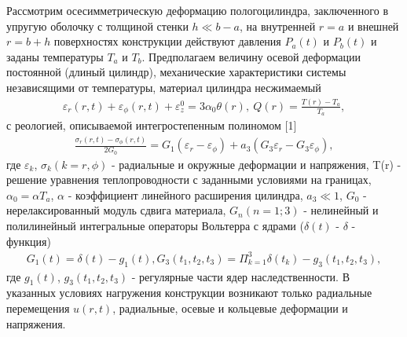 \vzmscaption

Рассмотрим осесимметрическую деформацию полого цилиндра, заключенного в упругую оболочку с толщиной стенки $h \ll b-a$,
на внутренней $r=a$ и внешней $r=b+h$ поверхностях конструкции действуют давления $P_a(t)$ и $P_b(t)$ и заданы температуры $T_a$ и $T_b$.
Предполагаем величину осевой деформации постоянной (длиный цилиндр), механические характеристики системы независящими от температуры, материал цилиндра несжимаемый
\begin{equation}\label{eq:1}
    \begin{gathered}
        \varepsilon_r(r,t)+\varepsilon_\phi(r,t)+\varepsilon^0_z=3\alpha_0 \theta(r), \ Q(r)=\frac{T(r)-T_a}{T_a},
    \end{gathered}
\end{equation}
\noindent с реологией, описываемой интегростепенным полиномом [1]
\begin{equation}\label{eq:2}
    \begin{gathered}
        \frac{\sigma_r(r,t)-\sigma_\phi(r,t)}{2G_0}=G_1(\varepsilon_r-\varepsilon_\phi)+a_3(G_3\varepsilon_r-G_3\varepsilon_\phi),
    \end{gathered}
\end{equation}
\noindent где $\varepsilon_k$, $\sigma_k(k=r,\phi)$ - радиальные и окружные деформации и напряжения,
T(r) - решение уравнения теплопроводности с заданными условиями на границах,
$\alpha_0=\alpha T_a$, $\alpha$ - коэффициент линейного расширения цилиндра, $a_3 \ll 1$,
$G_0$ - нерелаксированный модуль сдвига материала, $G_n(n=1;3)$ - нелинейный и полилинейный интегральные операторы Вольтерра с ядрами ($\delta(t)$ - $\delta$ - функция)
\begin{equation}\label{eq:3}
    \begin{gathered}
        G_1(t)=\delta(t)-g_1(t), G_3(t_1,t_2,t_3)=\Pi^3_{k=1} \delta(t_k)-g_3(t_1,t_2,t_3),
    \end{gathered}
\end{equation}
\noindent где $g_1(t)$, $g_3(t_1,t_2,t_3)$ - регулярные части ядер наследственности.
В указанных условиях нагружения конструкции возникают только радиальные перемещения $u(r,t)$, радиальные, осевые и кольцевые деформации и напряжения.

